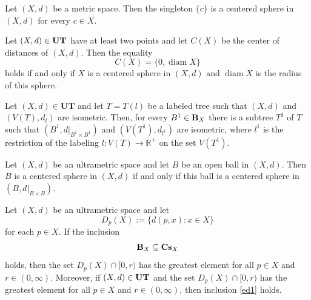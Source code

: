 \documentclass[10pt,a4paper]{amsart}
\begin{document}
\begin{Proposition}\label{sat}
Let $(X,d)$ be a metric space. Then the singleton $\{c\}$ is a centered sphere in $(X,d)$ for every $c\in X$.
\end{Proposition}

\begin{Theorem}\label{shak1}
Let $(X,d)\in {\bf  UT}$ have at least two points and let $C(X)$ be the center of distances of $(X,d)$.
Then the equality
\begin{equation}
    \label{ks1-1}
C(X)=\{0,\operatorname{diam}X\}
\end{equation}
holds if and only if $X$ is a centered sphere in $(X,d)$ and $\operatorname{diam} X$ is the radius of this sphere.
\end{Theorem}

\begin{Lemma}\label{scgkk}
Let $(X,d)\in \mathbf{UT}$ and let $T=T(l)$ be a labeled tree such that $(X,d)$ and $(V(T),d_l)$ are isometric.
Then, for every $B^{1}\in {\bf B}_{X}$ there is a subtree $T^{1}$ of $T$ such that $
(B^{1},d\big|_{B^{1}\times B^{1}})$
and
$(V(T^1), d_{l^{1}})$ are isometric,
 where $l^{1}$ is the restriction of the labeling
$l : V(T) \to \mathbb{R}^{+}$ on the set $V(T^{1})$.
\end{Lemma}

\begin{Lemma}\label{dhiu}
     Let $(X,d)$ be an ultrametric space and let $B$ be an open ball in $(X,d)$. Then $B$ is a centered sphere in $(X,d)$ if and only if this ball is a centered sphere in $(B, d|_{B\times B})$.
\end{Lemma}

\begin{Theorem}\label{efhik}
Let $(X,d)$ be an ultrametric space and let 
\begin{equation}
    \label{fesdi6-1}
D_p(X) := \{ d(p,x) : x \in X \}
\end{equation}
for each $p\in X$.
If the inclusion 
\begin{equation}
    \label{ed1}
{\bf B}_X \subseteq {\bf Cs}_X
\end{equation}
holds, then the set
$D_p(X)\cap [0,r)$ has the greatest element for all $p\in X$ and $r\in (0,\infty)$. Moreover, if $(X,d)\in {\bf UT}$ and the set $D_p(X)\cap [0,r)$ has the greatest element for all $p\in X$ and $r\in (0,\infty)$, then inclusion \eqref{ed1} holds.
\end{Theorem}
\end{document}
